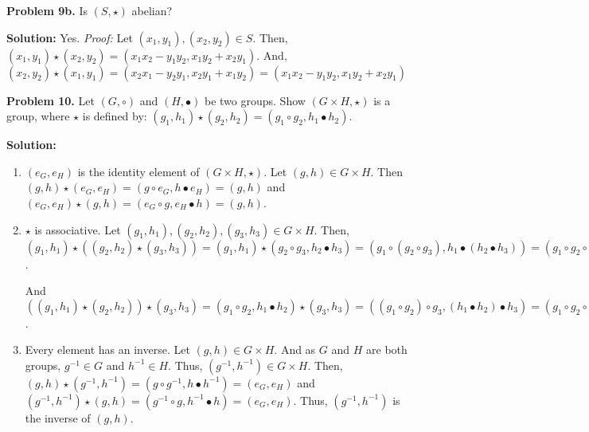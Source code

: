 \documentclass[12pt, letterpaper]{article}
\newenvironment{problem}
    [1]
    {\noindent \textbf{Problem #1.}}
    {\vspace{3mm}}
\newenvironment{solution}
    [0]
    {\noindent \textbf{Solution:}} 
    {\vspace{3mm}}
\begin{document}
    \begin{problem}{9b}
        Is $(S, \star)$ abelian?
    \end{problem}

    \begin{solution}
        Yes. \emph{Proof:} Let $(x_1, y_1), (x_2, y_2) \in S$. Then,
        $(x_1, y_1) \star (x_2, y_2) = (x_1 x_2 - y_1 y_2, x_1 y_2 + x_2 y_1)$. And,
        $(x_2, y_2) \star (x_1, y_1) = (x_2x_1 - y_2y_1, x_2y_1 + x_1y_2) = 
        (x_1x_2 - y_1y_2, x_1y_2 + x_2y_1)$
    \end{solution}

    \begin{problem}{10}
        Let $(G, \circ)$ and $(H, \bullet)$ be two groups. Show $(G \times H, \star)$
        is a group, where $\star$ is defined by: $(g_1, h_1) \star (g_2, h_2) = 
        (g_1 \circ g_2, h_1 \bullet h_2)$.
    \end{problem}

    \begin{solution}
        \begin{enumerate}
            \item $(e_G, e_H)$ is the identity element of $(G \times H, \star)$. Let $(g, h) \in
            G \times H$. Then $(g, h) \star (e_G, e_H) = (g \circ e_G, h \bullet e_H) = 
            (g, h)$ and $(e_G, e_H) \star (g, h) = (e_G \circ g, e_H \bullet h) = 
            (g, h)$.

            \item $\star$ is associative. Let $(g_1, h_1), (g_2, h_2), (g_3, h_3) \in G \times H$. Then,
            $(g_1, h_1) \star ((g_2, h_2) \star (g_3, h_3)) = (g_1, h_1) \star (g_2 \circ g_3, h_2 \bullet h_3) =
            (g_1 \circ (g_2 \circ g_3), h_1 \bullet (h_2 \bullet h_3)) = (g_1 \circ g_2 \circ g_3, h_1 \bullet h_2 \bullet h_3)$.

            And $((g_1, h_1) \star (g_2, h_2)) \star (g_3, h_3) = (g_1 \circ g_2, h_1 \bullet h_2) \star (g_3, h_3) = 
            ((g_1 \circ g_2) \circ g_3, (h_1 \bullet h_2) \bullet h_3) = (g_1 \circ g_2 \circ g_3, h_1 \bullet h_2 \bullet h_3)$.

            \item Every element has an inverse. Let $(g, h) \in G \times H$. And as $G$ and $H$ are both groups,
            $g^{-1} \in G$ and $h^{-1} \in H$. Thus, $(g^{-1}, h^{-1}) \in G \times H$. Then, $(g, h) \star (g^{-1}, h^{-1}) = 
            (g \circ g^{-1}, h \bullet h^{-1}) = (e_G, e_H)$ and $(g^{-1}, h^{-1}) \star (g, h) = (g^{-1} \circ g, h^{-1} \bullet h) = 
            (e_G, e_H)$. Thus, $(g^{-1}, h^{-1})$ is the inverse of $(g, h)$.
        \end{enumerate}
    \end{solution}
    
\end{document}
